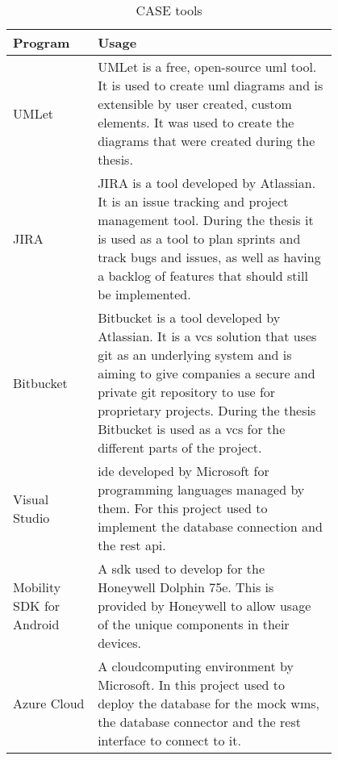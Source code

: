 \begin{table}[htbp]
	\begin{center}
	\begin{tabular}{|p{0.2\linewidth}|p{0.6\linewidth}|} \hline
	\textbf{Program} & \textbf{Usage} \\ \hline
	UMLet & UMLet is a free, open-source \gls{uml} tool. It is used to create \gls{uml} diagrams and is extensible by user created, custom elements. \citep{website:umlet} It was used to create the diagrams that were created during the thesis.  \\ \hline
	JIRA & JIRA is a tool developed by Atlassian. It is an issue tracking and project management tool. During the thesis it is used as a tool to plan sprints and track bugs and issues, as well as having a backlog of features that should still be implemented. \\ \hline
	Bitbucket & Bitbucket is a tool developed by Atlassian. It is a \gls{vcs} solution that uses git as an underlying system and is aiming to give companies a secure and private git repository to use for proprietary projects. During the thesis Bitbucket is used as a \gls{vcs} for the different parts of the project. \\ \hline
	Visual Studio & \gls{ide} developed by Microsoft for programming languages managed by them. For this project used to implement the database connection and the \gls{rest} \gls{api}. \\ \hline
	Mobility SDK for Android & A \gls{sdk} used to develop for the Honeywell Dolphin 75e. This is provided by Honeywell to allow usage of the unique components in their devices.\\ \hline
	Azure Cloud & A \gls{cloudcomputing} environment by Microsoft. In this project used to deploy the database for the mock \gls{wms}, the database connector and the \gls{rest} interface to connect to it. \\ \hline
	\end{tabular}
	\end{center}
	\caption{CASE tools}\label{tab:case}
\end{table}